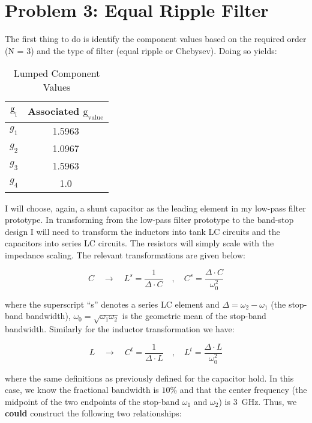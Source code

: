 \section*{Problem 3: Equal Ripple Filter}

The first thing to do is identify the component values based on the required
order (N = 3) and the type of filter (equal ripple or Chebysev). Doing so yields:

\begin{table}[h]
    \centering
    \caption{Lumped Component Values}
    \label{tab:3a_lumped_component_values}
    \begin{tabular}{|c|c|}
        \hline $\text{g}_{\text{i}} $ & Associated $\text{g}_{\text{value}} $ \\
        \hline $ g_1 $ & 1.5963 \\
        \hline $ g_2 $ & 1.0967 \\
        \hline $ g_3 $ & 1.5963 \\
        \hline $ g_4 $ & 1.0 \\
        \hline
    \end{tabular}
\end{table}

I will choose, again, a shunt capacitor as the leading element in my low-pass
filter prototype. In transforming from the low-pass filter prototype to the
band-stop design I will need to transform the inductors into tank LC circuits
and the capacitors into series LC circuits. The resistors will simply scale with
the impedance scaling. The relevant transformations are given below:

\[ 
    C \quad \rightarrow \quad L^s = \frac{1}{\Delta \cdot C} \quad,\quad C^s = \frac{\Delta
    \cdot C}{\omega_0^2}
\]

where the superscript ``s'' denotes a series LC element and $\Delta = \omega_2
- \omega_1$ (the stop-band bandwidth), $\omega_0 = \sqrt{\omega_1\omega_2}$ is
the geometric mean of the stop-band bandwidth. Similarly for the inductor
transformation we have:

\[ 
L \quad \rightarrow \quad C^t = \frac{1}{\Delta \cdot L} \quad,\quad L^t = \frac{\Delta
\cdot L}{\omega_0^2}
\]

where the same definitions as previously defined for the capacitor hold. In this
case, we know the fractional bandwidth is $10 \%$ and that the center frequency
(the midpoint of the two endpoints of the stop-band $\omega_1$ and $\omega_2$)
is \SI{3}{\giga\hertz}. Thus, we \textbf{could} construct the following two relationships:

